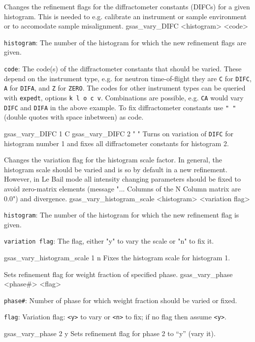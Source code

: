{
Changes the refinement flags for the diffractometer constants (DIFCs) for a given histogram. This is needed to e.g. calibrate an instrument or sample environment or to accomodate sample misalignment.
}{
gsas\_vary\_DIFC <histogram> <code>
}{
\item \texttt{histogram}: The number of the histogram for which the new refinement flags are given.
\item \texttt{code}: The code(s) of the diffractometer constants that should be varied. These depend on the instrument type, e.g. for neutron time-of-flight they are \texttt{C} for \texttt{DIFC}, \texttt{A} for \texttt{DIFA}, and \texttt{Z} for \texttt{ZERO}. The codes for other instrument types can be queried with \texttt{expedt}, options \texttt{k l o c v}. Combinations are possible, e.g. \texttt{CA} would vary \texttt{DIFC} and \texttt{DIFA} in the above example. To fix diffractometer constants use \texttt{" "} (double quotes with space inbetween) as code.
}{
gsas\_vary\_DIFC 1 C
\newline
gsas\_vary\_DIFC 2 " "
}{
Turns on variation of \texttt{DIFC} for histogram number 1 and fixes all diffractometer constants for histogram 2.
}

{
Changes the variation flag for the histogram scale factor. In general, the histogram scale should be varied and is so by default in a new refinement. However, in Le Bail mode all intensity changing parameters should be fixed to avoid zero-matrix elements (message "... Columns of the N Column matrix are 0.0") and divergence.
}{
gsas\_vary\_histogram\_scale <histogram> <variation flag>
}{
\item \texttt{histogram}: The number of the histogram for which the new refinement flag is given.
\item \texttt{variation flag}: The flag, either "y" to vary the scale or "n" to fix it.
}{
gsas\_vary\_histogram\_scale 1 n
}{
Fixes the histogram scale for histogram 1.
}

{
Sets refinement flag for weight fraction of specified phase.  
}{
gsas\_vary\_phase <phase\#> <flag>
}{
\item \texttt{phase\#}:  Number of phase for which weight fraction should be varied or fixed. 
\item \texttt{flag}: Variation flag: \texttt{<y>} to vary or \texttt{<n>} to fix; if no flag then assume \texttt{<y>}.  
}{
gsas\_vary\_phase 2 y
}{
Sets refinement flag for phase 2 to ``y'' (vary it).
}

